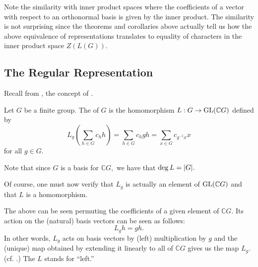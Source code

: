 Note the similarity with inner product spaces where the coefficients of a vector with respect to an orthonormal basis is given by the inner product. The similarity is not surprising since the theorems and corollaries above actually tell us how the above equivalence of representations translates to equality of characters in the inner product space $Z(L(G)).$

\subsection{The Regular Representation}
Recall from , the concept of .

\begin{defn}%
	\label{defn:regularrepresentation}
	Let $G$ be a finite group. The  of $G$ is the homomorphism $L : G \to \operatorname{GL}(\mathbb{C}G)$ defined by
	\begin{equation*} 
		L_g\left(\sum_{h \in G} c_h h\right) = \sum_{h \in G} c_hgh = \sum_{x \in G} c_{g^{-1} x}x
	\end{equation*}
	for all $g \in G.$
\end{defn}

\begin{rem} \label{rem:degofregrep}
	Note that since $G$ is a basis for $\mathbb{C}G,$ we have that $\deg L = {\left\lvert G \right\lvert}.$
\end{rem}
\begin{rem}
	Of course, one must now verify that $L_g$ is actually an element of $\operatorname{GL}(\mathbb{C}G)$ and that $L$ is a homomorphism.
	
	The above can be seen permuting the coefficients of a given element of $\mathbb{C}G.$ Its action on the (natural) basis vectors can be seen as follows:
	\begin{equation*} 
		L_gh = gh.
	\end{equation*}
	In other words, $L_g$ acts on basis vectors by (left) multiplication by $g$ and the (unique) map obtained by extending it linearly to all of $\mathbb{C}G$ gives us the map $L_g.$ (cf. .) The $L$ stands for ``left.''
\end{rem}

